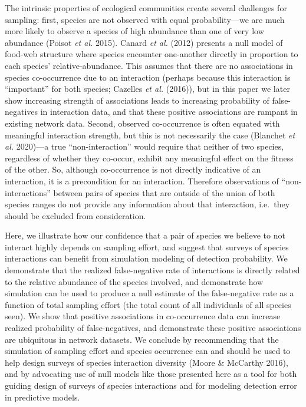 \documentclass[10pt,oneside]{article}
\begin{document}
The intrinsic properties of ecological communities create several
challenges for sampling: first, species are not observed with equal
probability---we are much more likely to observe a species of high
abundance than one of very low abundance (Poisot \emph{et al.} 2015).
Canard \emph{et al.} (2012) presents a null model of food-web structure
where species encounter one-another directly in proportion to each
species' relative-abundance. This assumes that there are no associations
in species co-occurrence due to an interaction (perhaps because this
interaction is ``important'' for both species; Cazelles \emph{et al.}
(2016)), but in this paper we later show increasing strength of
associations leads to increasing probability of false-negatives in
interaction data, and that these positive associations are rampant in
existing network data. Second, observed co-occurrence is often equated
with meaningful interaction strength, but this is not necessarily the
case (Blanchet \emph{et al.} 2020)---a true ``non-interaction'' would
require that neither of two species, regardless of whether they
co-occur, exhibit any meaningful effect on the fitness of the other. So,
although co-occurrence is not directly indicative of an interaction, it
is a precondition for an interaction. Therefore observations of
``non-interactions'' between pairs of species that are outside of the
union of both species ranges do not provide any information about that
interaction, i.e.~they should be excluded from consideration.

Here, we illustrate how our confidence that a pair of species we believe
to not interact highly depends on sampling effort, and suggest that
surveys of species interactions can benefit from simulation modeling of
detection probability. We demonstrate that the realized false-negative
rate of interactions is directly related to the relative abundance of
the species involved, and demonstrate how simulation can be used to
produce a null estimate of the false-negative rate as a function of
total sampling effort (the total count of all individuals of all species
seen). We show that positive associations in co-occurrence data can
increase realized probability of false-negatives, and demonstrate these
positive associations are ubiquitous in network datasets. We conclude by
recommending that the simulation of sampling effort and species
occurrence can and should be used to help design surveys of species
interaction diversity (Moore \& McCarthy 2016), and by advocating use of
null models like those presented here as a tool for both guiding design
of surveys of species interactions and for modeling detection error in
predictive models.
\end{document}
